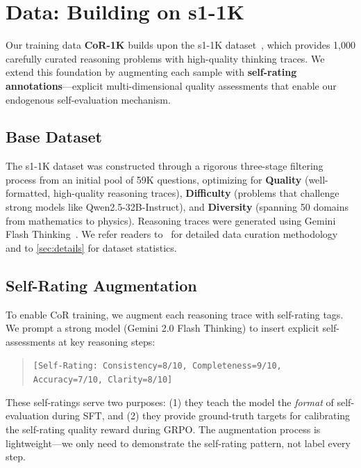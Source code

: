 \documentclass{article}
\theoremstyle{plain}
\theoremstyle{definition}
\theoremstyle{remark}
\newcommand{\data}{\textbf{CoR-1K}}
\begin{document}
\section{Data: Building on s1-1K}
\label{sec:data}

Our training data \data{} builds upon the s1-1K dataset~\citep{muennighoff2025s1}, which provides 1,000 carefully curated reasoning problems with high-quality thinking traces. We extend this foundation by augmenting each sample with \textbf{self-rating annotations}---explicit multi-dimensional quality assessments that enable our endogenous self-evaluation mechanism.

\subsection{Base Dataset}
\label{sec:base}

The s1-1K dataset was constructed through a rigorous three-stage filtering process from an initial pool of 59K questions, optimizing for \textbf{Quality} (well-formatted, high-quality reasoning traces), \textbf{Difficulty} (problems that challenge strong models like Qwen2.5-32B-Instruct), and \textbf{Diversity} (spanning 50 domains from mathematics to physics). Reasoning traces were generated using Gemini Flash Thinking~\citep{geminithinking}. We refer readers to~\citet{muennighoff2025s1} for detailed data curation methodology and to \autoref{sec:details} for dataset statistics.

\subsection{Self-Rating Augmentation}
\label{sec:augmentation}

To enable CoR training, we augment each reasoning trace with self-rating tags. We prompt a strong model (Gemini 2.0 Flash Thinking) to insert explicit self-assessments at key reasoning steps:

\begin{quote}
\small\texttt{[Self-Rating: Consistency=8/10, Completeness=9/10, Accuracy=7/10, Clarity=8/10]}
\end{quote}

These self-ratings serve two purposes: (1) they teach the model the \textit{format} of self-evaluation during SFT, and (2) they provide ground-truth targets for calibrating the self-rating quality reward during GRPO. The augmentation process is lightweight---we only need to demonstrate the self-rating pattern, not label every step.
\end{document}
